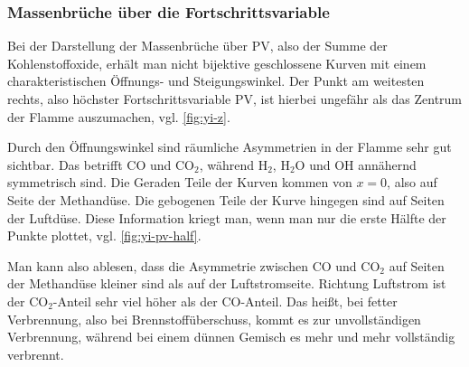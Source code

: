 \subsubsection{Massenbrüche über die Fortschrittsvariable}
\label{sct:oppdiff-Le1:yi-pv}

Bei der Darstellung der Massenbrüche über \gls{PV}, also der Summe der Kohlenstoffoxide, erhält man nicht bijektive geschlossene Kurven mit einem charakteristischen Öffnungs- und Steigungswinkel. Der Punkt am weitesten rechts, also höchster Fortschrittsvariable \gls{PV}, ist hierbei ungefähr als das Zentrum der Flamme auszumachen, vgl. \autoref{fig:yi-z}.

Durch den Öffnungswinkel sind räumliche Asymmetrien in der Flamme sehr gut sichtbar. Das betrifft $\mathrm{CO}$ und $\mathrm{CO}_2$, während $\mathrm{H}_2$, $\mathrm{H}_2\mathrm{O}$ und $\mathrm{OH}$ annähernd symmetrisch sind.
Die Geraden Teile der Kurven kommen von $x=0$, also auf Seite der Methandüse. Die gebogenen Teile der Kurve hingegen sind auf Seiten der Luftdüse. Diese Information kriegt man, wenn man nur die erste Hälfte der Punkte plottet, vgl. \autoref{fig:yi-pv-half}.

Man kann also ablesen, dass die Asymmetrie zwischen $\mathrm{CO}$ und $\mathrm{CO}_2$ auf Seiten der Methandüse kleiner sind als auf der Luftstromseite. Richtung Luftstrom ist der $\mathrm{CO}_2$-Anteil sehr viel höher als der $\mathrm{CO}$-Anteil. Das heißt, bei fetter Verbrennung, also bei Brennstoffüberschuss, kommt es zur unvollständigen Verbrennung, während bei einem dünnen Gemisch es mehr und mehr vollständig verbrennt.

